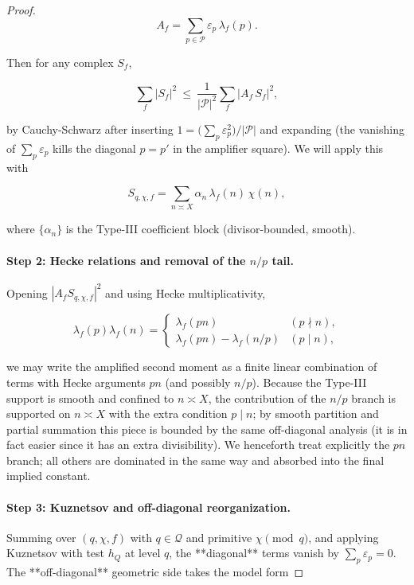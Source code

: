 \documentclass[11pt]{article}
\theoremstyle{definition}
\theoremstyle{remark}
\begin{document}
\begin{proof}
	$$
		A_f=\sum_{p\in\mathcal P}\varepsilon_p\,\lambda_f(p).
	$$

	Then for any complex $S_f$,

	$$
		\sum_f |S_f|^2
		\ \le\ \frac1{|\mathcal P|^2}\sum_f |A_f\,S_f|^2,
	$$

	by Cauchy-Schwarz after inserting $1=\big(\sum_p\varepsilon_p^2\big)/|\mathcal P|$ and expanding (the vanishing of $\sum_p\varepsilon_p$ kills the diagonal $p=p'$ in the amplifier square). We will apply this with

	$$
		S_{q,\chi,f}=\sum_{n\asymp X}\alpha_n\,\lambda_f(n)\,\chi(n),
	$$

	where $\{\alpha_n\}$ is the Type-III coefficient block (divisor-bounded, smooth).

	\paragraph{Step 2: Hecke relations and removal of the $n/p$ tail.}

	Opening $|A_f S_{q,\chi,f}|^2$ and using Hecke multiplicativity,

	$$
		\lambda_f(p)\lambda_f(n)=
		\begin{cases}
			\lambda_f(pn)                & (p\nmid n), \\
			\lambda_f(pn)-\lambda_f(n/p) & (p\mid n),
		\end{cases}
	$$

	we may write the amplified second moment as a finite linear combination of terms with Hecke arguments $pn$ (and possibly $n/p$). Because the Type-III support is smooth and confined to $n\asymp X$, the contribution of the $n/p$ branch is supported on $n\asymp X$ with the extra condition $p\mid n$; by smooth partition and partial summation this piece is bounded by the same off-diagonal analysis (it is in fact easier since it has an extra divisibility). We henceforth treat explicitly the $pn$ branch; all others are dominated in the same way and absorbed into the final implied constant.

	\paragraph{Step 3: Kuznetsov and off-diagonal reorganization.}

	Summing over $(q,\chi,f)$ with $q\in\mathcal Q$ and primitive $\chi\pmod q$, and applying Kuznetsov with test $h_Q$ at level $q$, the **diagonal** terms vanish by $\sum_p\varepsilon_p=0$. The **off-diagonal** geometric side takes the model form


\end{proof}
\end{document}
